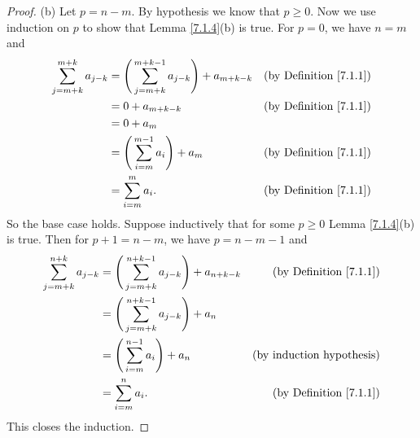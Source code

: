 \begin{proof}{(b)}
    Let \(p = n - m\).
    By hypothesis we know that \(p \geq 0\).
    Now we use induction on \(p\) to show that Lemma \ref{7.1.4}(b) is true.
    For \(p = 0\), we have \(n = m\) and
    \begin{align*}
        \sum_{j = m + k}^{m + k} a_{j - k} & = \Bigg(\sum_{j = m + k}^{m + k - 1} a_{j - k}\Bigg) + a_{m + k - k} & \text{(by Definition \ref{7.1.1})} \\
                                           & = 0 + a_{m + k - k}                                                  & \text{(by Definition \ref{7.1.1})} \\
                                           & = 0 + a_m                                                                                                 \\
                                           & = \Bigg(\sum_{i = m}^{m - 1} a_i\Bigg) + a_m                         & \text{(by Definition \ref{7.1.1})} \\
                                           & = \sum_{i = m}^m a_i.                                                & \text{(by Definition \ref{7.1.1})}
    \end{align*}
    So the base case holds.
    Suppose inductively that for some \(p \geq 0\) Lemma \ref{7.1.4}(b) is true.
    Then for \(p + 1 = n - m\), we have \(p = n - m - 1\) and
    \begin{align*}
        \sum_{j = m + k}^{n + k} a_{j - k} & = \Bigg(\sum_{j = m + k}^{n + k - 1} a_{j - k}\Bigg) + a_{n + k - k} & \text{(by Definition \ref{7.1.1})} \\
                                           & = \Bigg(\sum_{j = m + k}^{n + k - 1} a_{j - k}\Bigg) + a_n                                                \\
                                           & = \Bigg(\sum_{i = m}^{n - 1} a_i\Bigg) + a_n                         & \text{(by induction hypothesis)}   \\
                                           & = \sum_{i = m}^n a_i.                                                & \text{(by Definition \ref{7.1.1})}
    \end{align*}
    This closes the induction.
\end{proof}

